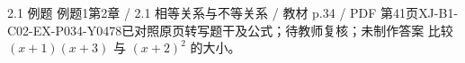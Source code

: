 \par\noindent\begin{minipage}{\linewidth}
\begin{bankitem}{2.1 例题 例题1}{第2章 / 2.1 相等关系与不等关系 / 教材 p.34 / PDF 第41页}{XJ-B1-C02-EX-P034-Y0478}{已对照原页转写题干及公式；待教师复核；未制作答案}
比较 $(x+1)(x+3)$ 与 $(x+2)^2$ 的大小。
\end{bankitem}
\end{minipage}\par\medskip
